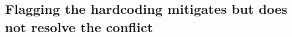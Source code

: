 


\subsection{Flagging the hardcoding mitigates but does not resolve the conflict}
\label{sec:hint}


